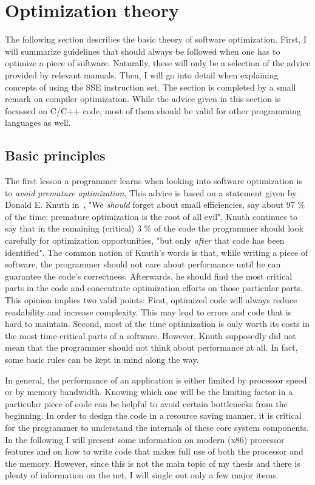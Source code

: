 \section{Optimization theory}
\label{Optimization_theory}
The following section describes the basic theory of software optimization. First, I will summarize guidelines that should always be followed when one has to optimize a piece of software. Naturally, these will only be a selection of the advice provided by relevant manuals. Then, I will go into detail when explaining concepts of using the SSE instruction set. The section is completed by a small remark on compiler optimization. While the advice given in this section is focussed on C/C++ code, most of them should be valid for other programming languages as well.

\subsection{Basic principles}
The first lesson a programmer learns when looking into software optimization is to \emph{avoid premature optimization}. This advice is based on a statement given by Donald E. Knuth in~\cite{knuth1974}, "We \emph{should} forget about small efficiencies, say about 97 \% of the time: premature optimization is the root of all evil". Knuth continues to say that in the remaining (critical) 3 \% of the code the programmer should look carefully for optimization opportunities, "but only \emph{after} that code has been identified". The common notion of Knuth's words is that, while writing a piece of software, the programmer should not care about performance until he can guarantee the code's correctness. Afterwards, he should find the most critical parts in the code and concentrate optimization efforts on those particular parts. This opinion implies two valid points: First, optimized code will always reduce readability and increase complexity. This may lead to errors and code that is hard to maintain. Second, most of the time optimization is only worth its costs in the most time-critical parts of a software. However, Knuth supposedly did not mean that the programmer should not think about performance at all. In fact, some basic rules can be kept in mind along the way. 

In general, the performance of an application is either limited by processor speed or by memory bandwidth. Knowing which one will be the limiting factor in a particular piece of code can be helpful to avoid certain bottlenecks from the beginning. In order to design the code in a resource saving manner, it is critical for the programmer to understand the internals of these core system components. In the following I will present some information on modern (x86) processor features and on how to write code that makes full use of both the processor and the memory. However, since this is not the main topic of my thesis and there is plenty of information on the net, I will single out only a few major items.

